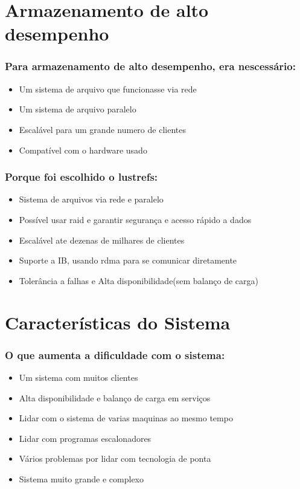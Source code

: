 \documentclass[10pt]{beamer}
\begin{document}
\section{Armazenamento de alto desempenho}
	\begin{frame} %
	\frametitle{Para armazenamento de alto desempenho, era nescessário:}
		\begin{itemize}[<+->]
			\item Um sistema de arquivo que funcionasse via rede
			\item Um sistema de arquivo paralelo
			\item Escalável para um grande numero de clientes
			\item Compatível com o hardware usado
		\end{itemize}
	\end{frame}

	\begin{frame}
	\frametitle{Porque foi escolhido o lustrefs:}
		\begin{itemize}[<+->]
			\item Sistema de arquivos via rede e paralelo
			\item Possível usar raid e garantir segurança e acesso rápido a dados
			\item Escalável ate dezenas de milhares de clientes
			\item Suporte a IB, usando rdma para se comunicar diretamente
			\item Tolerância a falhas e Alta disponibilidade(sem balanço de carga)
		\end{itemize}
	\end{frame}

\section{Características do Sistema}
	\begin{frame}
	\frametitle{O que aumenta a dificuldade com o sistema:}
		\begin{itemize}[<+->]
			\item Um sistema com muitos clientes
			\item Alta disponibilidade e balanço de carga em serviços
			\item Lidar com o sistema de varias maquinas ao mesmo tempo
			\item Lidar com programas escalonadores
			\item Vários problemas por lidar com tecnologia de ponta
			\item Sistema muito grande e complexo
		\end{itemize}
	\end{frame}
\end{document}
